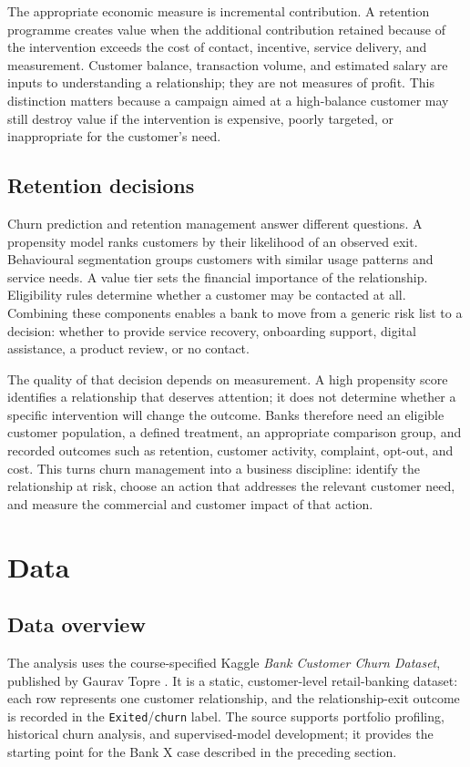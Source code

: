 \documentclass[a4paper,12pt]{article}
\begin{document}
The appropriate economic measure is incremental contribution. A retention programme creates value when the additional contribution retained because of the intervention exceeds the cost of contact, incentive, service delivery, and measurement. Customer balance, transaction volume, and estimated salary are inputs to understanding a relationship; they are not measures of profit. This distinction matters because a campaign aimed at a high-balance customer may still destroy value if the intervention is expensive, poorly targeted, or inappropriate for the customer's need.

\subsection{Retention decisions}

Churn prediction and retention management answer different questions. A propensity model ranks customers by their likelihood of an observed exit. Behavioural segmentation groups customers with similar usage patterns and service needs. A value tier sets the financial importance of the relationship. Eligibility rules determine whether a customer may be contacted at all. Combining these components enables a bank to move from a generic risk list to a decision: whether to provide service recovery, onboarding support, digital assistance, a product review, or no contact.

The quality of that decision depends on measurement. A high propensity score identifies a relationship that deserves attention; it does not determine whether a specific intervention will change the outcome. Banks therefore need an eligible customer population, a defined treatment, an appropriate comparison group, and recorded outcomes such as retention, customer activity, complaint, opt-out, and cost. This turns churn management into a business discipline: identify the relationship at risk, choose an action that addresses the relevant customer need, and measure the commercial and customer impact of that action.

\section{Data}

\subsection{Data overview}

The analysis uses the course-specified Kaggle \emph{Bank Customer Churn Dataset}, published by Gaurav Topre \citep{topreKaggle}. It is a static, customer-level retail-banking dataset: each row represents one customer relationship, and the relationship-exit outcome is recorded in the \texttt{Exited}/\texttt{churn} label. The source supports portfolio profiling, historical churn analysis, and supervised-model development; it provides the starting point for the Bank X case described in the preceding section.
\end{document}
